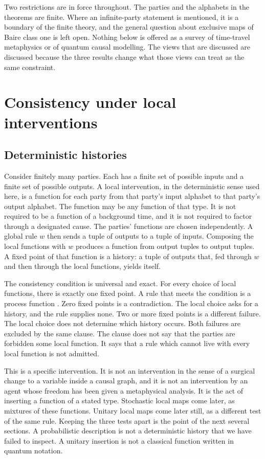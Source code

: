\documentclass[11pt]{article}
\begin{document}
Two restrictions are in force throughout. The parties and the alphabets in the theorems are finite. Where an infinite-party statement is mentioned, it is a boundary of the finite theory, and the general question about exclusive maps of Baire class one is left open. Nothing below is offered as a survey of time-travel metaphysics or of quantum causal modelling. The views that are discussed are discussed because the three results change what those views can treat as the same constraint.

\section{Consistency under local interventions}
\label{sec:cons}

\subsection{Deterministic histories}
\label{sec:det}

Consider finitely many parties. Each has a finite set of possible inputs and a finite set of possible outputs. A local intervention, in the deterministic sense used here, is a function for each party from that party's input alphabet to that party's output alphabet. The function may be any function of that type. It is not required to be a function of a background time, and it is not required to factor through a designated cause. The parties' functions are chosen independently. A global rule \(w\) then sends a tuple of outputs to a tuple of inputs. Composing the local functions with \(w\) produces a function from output tuples to output tuples. A fixed point of that function is a history: a tuple of outputs that, fed through \(w\) and then through the local functions, yields itself.

The consistency condition is universal and exact. For every choice of local functions, there is exactly one fixed point. A rule that meets the condition is a process function \citep{baumeler2016,adlam2023}. Zero fixed points is a contradiction. The local choice asks for a history, and the rule supplies none. Two or more fixed points is a different failure. The local choice does not determine which history occurs. Both failures are excluded by the same clause. The clause does not say that the parties are forbidden some local function. It says that a rule which cannot live with every local function is not admitted.

This is a specific intervention. It is not an intervention in the sense of a surgical change to a variable inside a causal graph, and it is not an intervention by an agent whose freedom has been given a metaphysical analysis. It is the act of inserting a function of a stated type. Stochastic local maps come later, as mixtures of these functions. Unitary local maps come later still, as a different test of the same rule. Keeping the three tests apart is the point of the next several sections. A probabilistic description is not a deterministic history that we have failed to inspect. A unitary insertion is not a classical function written in quantum notation.
\end{document}

